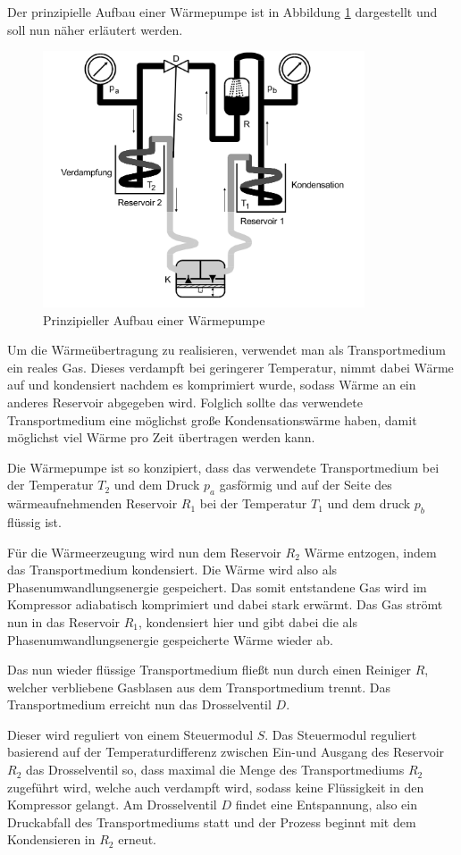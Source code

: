 
\label{sec:Versuchsaufbau}
Der prinzipielle Aufbau einer Wärmepumpe ist in Abbildung \ref{fig:bild1} dargestellt und soll nun näher erläutert werden.

\begin{figure}
  \centering
  \includegraphics[width=0.85\textwidth]{content/aufbau_waermepumpe.png}
  \caption{Prinzipieller Aufbau einer Wärmepumpe \cite{Anleitung}}
  \label{fig:bild1}
\end{figure}

Um die Wärmeübertragung zu realisieren, verwendet man als Transportmedium ein reales Gas. Dieses verdampft bei geringerer Temperatur, nimmt dabei Wärme auf und kondensiert nachdem es komprimiert wurde, sodass Wärme an ein anderes Reservoir abgegeben wird.
Folglich sollte das verwendete Transportmedium eine möglichst große Kondensationswärme haben, damit möglichst viel Wärme pro Zeit übertragen werden kann.

Die Wärmepumpe ist so konzipiert, dass das verwendete Transportmedium bei der Temperatur $T_2$ und dem Druck $p_a$ gasförmig und auf der Seite des wärmeaufnehmenden Reservoir $R_1$ bei der Temperatur $T_1$ und dem druck $p_b$ flüssig ist.

Für die Wärmeerzeugung wird nun dem Reservoir $R_2$ Wärme entzogen, indem das Transportmedium kondensiert. Die Wärme wird also als Phasenumwandlungsenergie gespeichert.
Das somit entstandene Gas wird im Kompressor adiabatisch komprimiert und dabei stark erwärmt.
Das Gas strömt nun in das Reservoir $R_1$, kondensiert hier und gibt dabei die als Phasenumwandlungsenergie gespeicherte Wärme wieder ab.

Das nun wieder flüssige Transportmedium fließt nun durch einen Reiniger $R$, welcher verbliebene Gasblasen aus dem Transportmedium trennt.
Das Transportmedium erreicht nun das Drosselventil $D$.

Dieser wird reguliert von einem Steuermodul $S$. Das Steuermodul reguliert basierend auf der Temperaturdifferenz zwischen Ein-und Ausgang des Reservoir $R_2$ das Drosselventil so, dass maximal die Menge des Transportmediums $R_2$ zugeführt wird, welche auch verdampft wird, sodass keine Flüssigkeit in den Kompressor gelangt.
Am Drosselventil $D$ findet eine Entspannung, also ein Druckabfall des Transportmediums statt und der Prozess beginnt mit dem Kondensieren in $R_2$ erneut.
